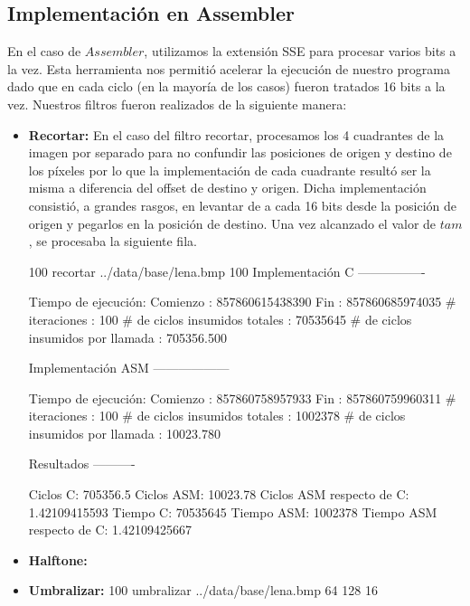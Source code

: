 \documentclass[10pt, a4paper]{article}
\begin{document}
\subsection{Implementación en Assembler}
En el caso de $Assembler$, utilizamos la extensión SSE para procesar varios bits a la vez. Esta herramienta nos permitió acelerar la ejecución de nuestro programa dado que en cada ciclo (en la mayoría de los casos) fueron tratados 16 bits a la vez.\newline
Nuestros filtros fueron realizados de la siguiente manera:
\begin{itemize}
\item {\textbf{Recortar:}}
En el caso del filtro recortar, procesamos los 4 cuadrantes de la imagen por separado para no confundir las posiciones de origen y destino de los píxeles por lo que la implementación de cada cuadrante resultó ser la misma a diferencia del offset de destino y origen.\newline
Dicha implementación consistió, a grandes rasgos, en levantar de a cada 16 bits desde la posición de origen y pegarlos en la posición de destino. Una vez alcanzado el valor de $tam$, se procesaba la siguiente fila.

100 recortar ../data/base/lena.bmp 100
Implementación C
----------------

Tiempo de ejecución:
  Comienzo                          : 857860615438390
  Fin                               : 857860685974035
  # iteraciones                     : 100
  # de ciclos insumidos totales     : 70535645
  # de ciclos insumidos por llamada : 705356.500

Implementación ASM
------------------

Tiempo de ejecución:
  Comienzo                          : 857860758957933
  Fin                               : 857860759960311
  # iteraciones                     : 100
  # de ciclos insumidos totales     : 1002378
  # de ciclos insumidos por llamada : 10023.780

Resultados
----------

Ciclos C:                 705356.5
Ciclos ASM:               10023.78
Ciclos ASM respecto de C: 1.42109415593%
Tiempo C:                 70535645
Tiempo ASM:               1002378
Tiempo ASM respecto de C: 1.42109425667%


\item {\textbf{Halftone:}}

\item {\textbf{Umbralizar:}}
100 umbralizar ../data/base/lena.bmp 64 128 16


\end{itemize}
\end{document}
